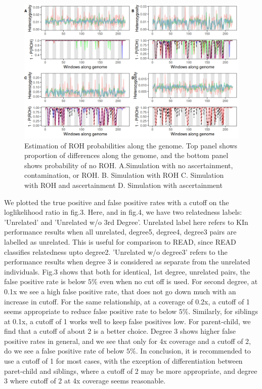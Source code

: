 \documentclass[12pt, letterpaper]{article}
\begin{document}
\begin{figure}[htp]
    \centering
    \includegraphics[width=18cm]{plots/plotimg/ROHplot.png}
    \caption{Estimation of ROH probabilities along the genome. Top panel shows proportion of differences along the genome, and the bottom panel shows probability of no ROH. A.Simulation with no ascertainment, contamination, or ROH. B. Simulation with ROH C. Simulation with ROH and ascertainment D. Simulation with ascertainment}
    \label{fig:galaxy}
\end{figure}


We plotted the true positive and false positive rates with a cutoff on the loglikelihood ratio in fig.3. Here, and in fig.4, we have two relatedness labels: 'Unrelated' and 'Unrelated w/o 3rd Degree'. Unrelated label here refers to KIn performance results when all unrelated, degree5, degree4, degree3 pairs are labelled as unrelated. This is useful for comparison to READ, since READ classifies relatedness upto degree2. 'Unrelated w/o degree3'  refers to the performance results when degree 3 is considered as separate from the unrelated individuals. Fig.3 shows that both for identical, 1st degree, unrelated pairs, the false positive rate is below $5\%$ even when no cut off is used. For second degree, at 0.1x we see a high false positive rate, that does not go down much with an increase in cutoff. For the same relationship, at a coverage of 0.2x, a cutoff of 1 seems appropriate to reduce false positive rate to below $5\%$. Similarly, for siblings at 0.1x, a cutoff of 1 works well to keep false positives low. For parent-child, we find that a cutoff of about 2 is a better choice. Degree 3 shows higher false positive rates in general, and we see that only for 4x coverage and a cutoff of 2, do we see a false positive rate of below $5\%$. In conclusion, it is recommended to use a cutoff of 1 for most cases, with the exception of differentiation between paret-child and siblings, where a cutoff of 2 may be more appropriate, and degree 3 where cutoff of 2 at 4x coverage seems reasonable. 
\end{document}
